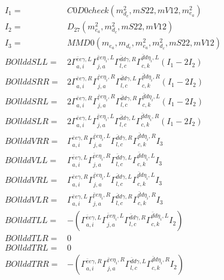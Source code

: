 \documentclass[A4,landscape]{article}
\begin{document}
\begin{align} 
I_1 = & C0D0check(m^2_{d_{{c}}}, mS22, mV12, m^2_{e_{{a}}}) \\ 
I_2 = & D_{27}(m^2_{e_{{a}}}, m^2_{d_{{c}}}, mS22, mV12) \\ 
I_3 = & MMD0(m_{e_{{a}}}, m_{d_{{c}}}, m^2_{e_{{a}}}, m^2_{d_{{c}}}, mS22, mV12) \\ 
  BOllddSLL= & 2  \Gamma^{\bar{e}e \gamma ,L}_{a, i} \Gamma^{\bar{e}e \eta_i ,L}_{j, a} \Gamma^{\bar{d}d \gamma ,R}_{l, c} \Gamma^{\bar{d}d \eta_i ,L}_{c, k} (I_1 - 2 I_2) \\ 
  BOllddSRR= & 2  \Gamma^{\bar{e}e \gamma ,R}_{a, i} \Gamma^{\bar{e}e \eta_i ,R}_{j, a} \Gamma^{\bar{d}d \gamma ,L}_{l, c} \Gamma^{\bar{d}d \eta_i ,R}_{c, k} (I_1 - 2 I_2) \\ 
  BOllddSRL= & 2  \Gamma^{\bar{e}e \gamma ,R}_{a, i} \Gamma^{\bar{e}e \eta_i ,R}_{j, a} \Gamma^{\bar{d}d \gamma ,R}_{l, c} \Gamma^{\bar{d}d \eta_i ,L}_{c, k} (I_1 - 2 I_2) \\ 
  BOllddSLR= & 2  \Gamma^{\bar{e}e \gamma ,L}_{a, i} \Gamma^{\bar{e}e \eta_i ,L}_{j, a} \Gamma^{\bar{d}d \gamma ,L}_{l, c} \Gamma^{\bar{d}d \eta_i ,R}_{c, k} (I_1 - 2 I_2) \\ 
  BOllddVRR= &  \Gamma^{\bar{e}e \gamma ,R}_{a, i} \Gamma^{\bar{e}e \eta_i ,L}_{j, a} \Gamma^{\bar{d}d \gamma ,R}_{l, c} \Gamma^{\bar{d}d \eta_i ,R}_{c, k} I_3 \\ 
  BOllddVLL= &  \Gamma^{\bar{e}e \gamma ,L}_{a, i} \Gamma^{\bar{e}e \eta_i ,R}_{j, a} \Gamma^{\bar{d}d \gamma ,L}_{l, c} \Gamma^{\bar{d}d \eta_i ,L}_{c, k} I_3 \\ 
  BOllddVRL= &  \Gamma^{\bar{e}e \gamma ,R}_{a, i} \Gamma^{\bar{e}e \eta_i ,L}_{j, a} \Gamma^{\bar{d}d \gamma ,L}_{l, c} \Gamma^{\bar{d}d \eta_i ,L}_{c, k} I_3 \\ 
  BOllddVLR= &  \Gamma^{\bar{e}e \gamma ,L}_{a, i} \Gamma^{\bar{e}e \eta_i ,R}_{j, a} \Gamma^{\bar{d}d \gamma ,R}_{l, c} \Gamma^{\bar{d}d \eta_i ,R}_{c, k} I_3 \\ 
  BOllddTLL= & -( \Gamma^{\bar{e}e \gamma ,L}_{a, i} \Gamma^{\bar{e}e \eta_i ,L}_{j, a} \Gamma^{\bar{d}d \gamma ,R}_{l, c} \Gamma^{\bar{d}d \eta_i ,L}_{c, k} I_2) \\ 
  BOllddTLR= & 0 \\ 
  BOllddTRL= & 0 \\ 
  BOllddTRR= & -( \Gamma^{\bar{e}e \gamma ,R}_{a, i} \Gamma^{\bar{e}e \eta_i ,R}_{j, a} \Gamma^{\bar{d}d \gamma ,L}_{l, c} \Gamma^{\bar{d}d \eta_i ,R}_{c, k} I_2) \\ 
\end{align} 
\end{document}
